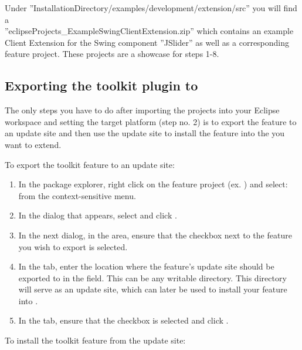 Under ''InstallationDirectory/examples/development/extension/src''
you will find a \\ ''eclipseProjects\_ExampleSwingClientExtension.zip'' which contains
 an example \app{} Client Extension for the Swing component ''JSlider'' as well
 as a corresponding feature project. These projects are a showcase for steps 1-8.
 
\subsection{Exporting the toolkit plugin to \app{}}
 The only steps you have to do after importing the projects into your Eclipse workspace and 
 setting the target platform (step no. 2) is to export the feature to an update site
 and then use the update site to install the feature into the \app{} you want to 
 extend.
 
To export the toolkit feature to an update site:

\begin{enumerate}
\item In the package explorer, right click on the feature project 
 (ex. ) and select: 
  from the context-sensitive menu.
\item In the dialog that appears, select  and click .
\item In the next dialog, in the  area, ensure that 
 the checkbox next to the feature you wish to export is selected.
\item In the  tab, enter the location 
 where the feature's update site should be exported to in the  
 field. This can be any writable directory. This directory will serve as an 
 update site, which can later be used to install your feature into \app{}.
\item In the  tab, ensure that the  checkbox is selected and click .
\end{enumerate}

To install the toolkit feature from the update site:

